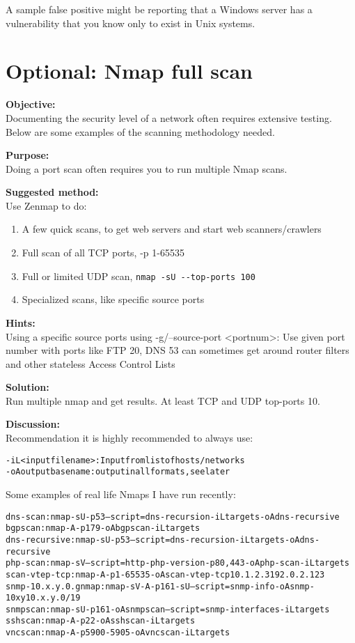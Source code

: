 \documentclass[a4paper,11pt,notitlepage]{report}
\begin{document}
A sample false positive might be reporting that a Windows server has a vulnerability that you know only to exist in Unix systems.


\chapter{Optional: Nmap full scan}
\label{ex:nmap-strategy}


{\bf Objective:} \\
Documenting the security level of a network often requires extensive testing. Below are some examples of the scanning methodology needed.


{\bf Purpose:}\\
Doing a port scan often requires you to run multiple Nmap scans.


{\bf Suggested method:}\\
Use Zenmap to do:
\begin{enumerate}
\item A few quick scans, to get web servers and start web scanners/crawlers
\item Full scan of all TCP ports, -p 1-65535
\item Full or limited UDP scan, \verb+nmap -sU --top-ports 100+
\item Specialized scans, like specific source ports
\end{enumerate}


{\bf Hints:} \\
Using a specific source ports using -g/--source-port <portnum>: Use given port number with ports like FTP 20, DNS 53 can sometimes get around router filters and other stateless Access Control Lists

{\bf Solution:}\\
Run multiple nmap and get results. At least TCP and UDP top-ports 10.

{\bf Discussion:}\\
Recommendation it is highly recommended to always use:
\begin{alltt}
-iL <inputfilename>: Input from list of hosts/networks
-oA outputbasename: output in all formats, see later
\end{alltt}

Some examples of real life Nmaps I have run recently:
\begin{alltt}
dns-scan: nmap -sU -p 53 --script=dns-recursion -iL targets -oA dns-recursive
bgpscan: nmap -A -p 179 -oA bgpscan -iL targets
dns-recursive: nmap -sU -p 53 --script=dns-recursion -iL targets -oA dns-recursive
php-scan: nmap -sV --script=http-php-version -p80,443 -oA php-scan -iL targets
scan-vtep-tcp: nmap -A -p 1-65535 -oA scan-vtep-tcp 10.1.2.3 192.0.2.123
snmp-10.x.y.0.gnmap: nmap -sV -A -p 161 -sU --script=snmp-info -oA snmp-10xy 10.x.y.0/19
snmpscan: nmap -sU -p 161 -oA snmpscan --script=snmp-interfaces -iL targets
sshscan: nmap -A -p 22 -oA sshscan -iL targets
vncscan: nmap -A -p 5900-5905 -oA vncscan -iL targets
\end{alltt}
\end{document}
